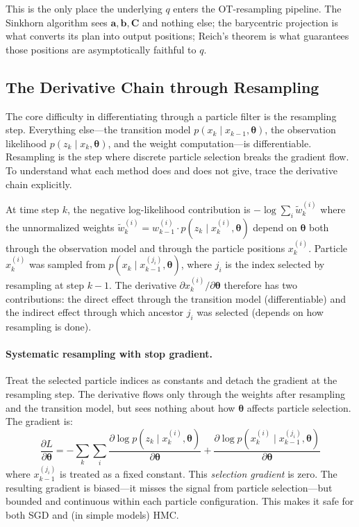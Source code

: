 \documentclass{article}
\renewcommand{\v}[1]{ \ensuremath{ {\mathbf{#1}} }}
\begin{document}
This is the only place the underlying $q$ enters the OT-resampling pipeline. The Sinkhorn algorithm sees $\mathbf{a}, \mathbf{b}, \mathbf{C}$ and nothing else; the barycentric projection is what converts its plan into output positions; Reich's theorem is what guarantees those positions are asymptotically faithful to $q$.

\subsection{The Derivative Chain through Resampling}
\label{sec:ot-derivative-chain}

The core difficulty in differentiating through a particle filter is the resampling step. Everything else---the transition model $p(x_k \mid x_{k-1}, \v\theta)$, the observation likelihood $p(z_k \mid x_k, \v\theta)$, and the weight computation---is differentiable. Resampling is the step where discrete particle selection breaks the gradient flow. To understand what each method does and does not give, trace the derivative chain explicitly.

At time step $k$, the negative log-likelihood contribution is $-\log \sum_i \tilde{w}_k^{(i)}$ where the unnormalized weights $\tilde{w}_k^{(i)} = w_{k-1}^{(i)} \cdot p(z_k \mid x_k^{(i)}, \v\theta)$ depend on $\v\theta$ both through the observation model and through the particle positions $x_k^{(i)}$. Particle $x_k^{(i)}$ was sampled from $p(x_k \mid x_{k-1}^{(j_i)}, \v\theta)$, where $j_i$ is the index selected by resampling at step $k-1$. The derivative $\partial x_k^{(i)} / \partial \v\theta$ therefore has two contributions: the direct effect through the transition model (differentiable) and the indirect effect through which ancestor $j_i$ was selected (depends on how resampling is done).

\paragraph{Systematic resampling with stop gradient.}
Treat the selected particle indices as constants and detach the gradient at the resampling step. The derivative flows only through the weights after resampling and the transition model, but sees nothing about how $\v\theta$ affects particle selection. The gradient is:
\begin{equation}
    \frac{\partial L}{\partial \v\theta} = -\sum_k \sum_i \frac{\partial \log p(z_k \mid x_k^{(i)}, \v\theta)}{\partial \v\theta} + \frac{\partial \log p(x_k^{(i)} \mid x_{k-1}^{(j_i)}, \v\theta)}{\partial \v\theta}
\end{equation}
where $x_{k-1}^{(j_i)}$ is treated as a fixed constant. This \textit{selection gradient} is zero. The resulting gradient is biased---it misses the signal from particle selection---but bounded and continuous within each particle configuration. This makes it safe for both SGD and (in simple models) HMC.
\end{document}
